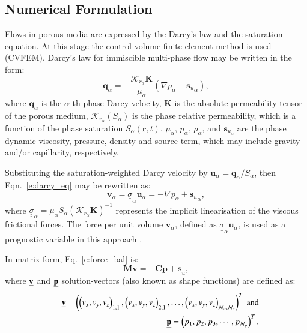 \documentclass[preprint,authoryear,12pt]{elsarticle}
\begin{document}
\subsection{Numerical Formulation}
\medskip
Flows in porous media are expressed by the Darcy's law and the saturation equation. At this stage the control volume finite element method is used (CVFEM). Darcy's law for immiscible multi-phase flow may be written in the form:
\begin{equation}\label{e:darcy_eq}
  \mathbf{q}_{\alpha} = -\frac{\mathcal{K}_{{r}_\alpha}\mathbf{K}}{\mu_{\alpha}}\left(\nabla p_{\alpha} - {\mathbf{s}_{u}}_{\alpha} \right),
\end{equation}
where $\mathbf{q}_{\alpha}$ is the $\alpha$-th phase Darcy velocity, $\mathbf{K}$ is the absolute permeability tensor of the porous medium, $\mathcal{K}_{{r}_\alpha}\left(S_{\alpha}\right)$ is the phase relative permeability, which is a function of the phase saturation $S_{\alpha}\left(\mathbf{r},t\right)$. $\mu_{\alpha}$, $p_{\alpha}$, $\rho_{\alpha}$, and $\mathbf{s}_{{u}_\alpha}$ are the phase dynamic viscosity, pressure, density and source term, which may include gravity and/or capillarity, respectively. 

Substituting the saturation-weighted Darcy velocity by $\mathbf{u}_\alpha= \mathbf{q}_\alpha/S_\alpha$, then Eqn.~\ref{e:darcy_eq} may be rewritten as:
\begin{equation}
  \mathbf{v}_\alpha={\underline {\underline \sigma}}_{\alpha} \mathbf{u}_{\alpha} = - \nabla p_{\alpha} + {\mathbf{s}_{u}}_{\alpha},
  \label{e:force_bal}
\end{equation}
where ${\underline {\underline \sigma}}_{\alpha}=\mu_\alpha S_\alpha \left(\mathcal{K}_{{r}_\alpha}\mathbf{K}\right)^{-1}$ represents the implicit linearisation of the viscous frictional forces. The force per unit volume $\mathbf{v}_\alpha$, defined as ${\underline {\underline \sigma}}_{\alpha} \mathbf{u}_\alpha$, is used as a prognostic variable in this approach \citep{pavlidis_2014}.

In matrix form, Eq.~\ref{e:force_bal} is: %
\begin{equation}
  {\mathbf M} \underline {\mathbf v} = -{\mathbf C} \underline{\mathbf p} + \underline {\mathbf s}_{u}, \label{force-balance-matrix-form}
\end{equation}
where $\underline{\bf v}$ and $\underline{\bf p}$ solution-vectors (also known as shape functions) are defined as:
\begin{eqnarray}
    &&\underline{{\bf v}} = \left( \left( {v_x},{v_y},{v_z} \right)_{1,1}, \left( {v_x},{v_y},{v_z} \right)  _{2,1},\ldots, \left( {v_x},{v_y},{v_z} \right)_{\mathcal{N}_\alpha,\mathcal{N}_u} \right)^{T} \;\text{and} \nonumber \\ 
    && \underline{{\bf p}} = \left(p_1, p_2, p_3, \cdots, p_{\mathcal{N}_p}\right)^T. \nonumber%
\end{eqnarray}
\end{document}
